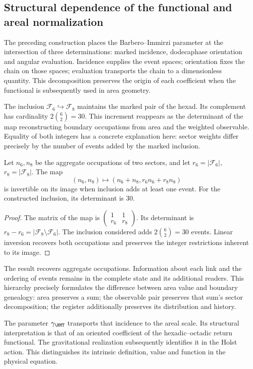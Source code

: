 \subsection{Structural dependence of the functional and areal normalization}

The preceding construction places the Barbero--Immirzi parameter at the intersection of three determinations: marked incidence, dodecaphase orientation and angular evaluation. Incidence supplies the event spaces; orientation fixes the chain on those spaces; evaluation transports the chain to a dimensionless quantity. This decomposition preserves the origin of each coefficient when the functional is subsequently used in area geometry.

The inclusion \(\mathcal F_6\hookrightarrow\mathcal F_8\) maintains the marked pair of the hexad. Its complement has cardinality \(2\binom62=30\). This increment reappears as the determinant of the map reconstructing boundary occupations from area and the weighted observable. Equality of both integers has a concrete explanation here: sector weights differ precisely by the number of events added by the marked inclusion.

\begin{proposition}
Let \(n_6,n_8\) be the aggregate occupations of two sectors, and let
\(r_6=|\mathcal F_6|\), \(r_8=|\mathcal F_8|\). The map
\[
 (n_6,n_8)\longmapsto(n_6+n_8,r_6n_6+r_8n_8)
\]
is invertible on its image when inclusion adds at least one event. For the constructed inclusion, its determinant is 30.
\end{proposition}
\begin{proof}
The matrix of the map is
\(\left(\begin{smallmatrix}1&1\\r_6&r_8\end{smallmatrix}\right)\). Its determinant is \(r_8-r_6=|\mathcal F_8\setminus\mathcal F_6|\). The inclusion considered adds \(2\binom62=30\) events. Linear inversion recovers both occupations and preserves the integer restrictions inherent to its image.
\end{proof}

The result recovers aggregate occupations. Information about each link and the ordering of events remains in the complete state and its additional readers. This hierarchy precisely formulates the difference between area value and boundary genealogy: area preserves a sum; the observable pair preserves that sum's sector decomposition; the register additionally preserves its distribution and history.

The parameter \(\gamma_{\HMT}\) transports that incidence to the areal scale. Its structural interpretation is that of an oriented coefficient of the hexadic--octadic return functional. The gravitational realization subsequently identifies it in the Holst action. This distinguishes its intrinsic definition, value and function in the physical equation.
